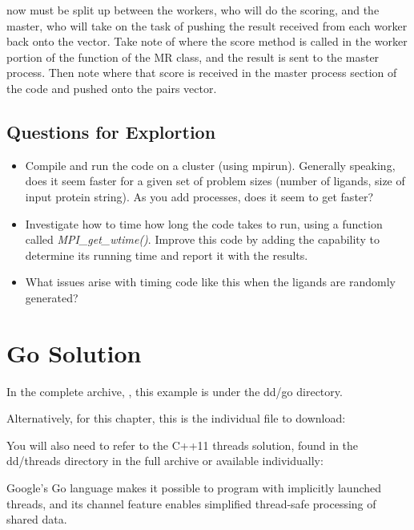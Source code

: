 \documentclass[letterpaper,10pt,openany,oneside]{sphinxmanual}
\begin{document}
now must be split up between the workers, who will do the scoring, and the master, who will take on the task of pushing the result received from each worker back onto the vector. Take note of where the score method is called in the worker portion of the  function of the MR class, and the result is sent to the master process. Then note where that score is received in the master process section of the code and pushed onto the pairs vector.


\subsection{Questions for Explortion}
\label{mpi/mpi:questions-for-explortion}\begin{itemize}
\item {} 
Compile and run the code on a cluster (using mpirun). Generally speaking, does it seem faster for a given set of problem sizes (number of ligands, size of input protein string). As you add processes, does it seem to get faster?

\item {} 
Investigate how to time how long the code takes to run, using a function called \emph{MPI\_get\_wtime()}. Improve this code by adding the capability to determine its running time and report it with the results.

\item {} 
What issues arise with timing code like this when the ligands are randomly generated?

\end{itemize}


\section{Go Solution}
\label{go/go::doc}\label{go/go:go-solution}
In the complete archive, , this example is under the dd/go directory.

Alternatively, for this chapter, this is the individual file to download:


You will also need to refer to the C++11 threads solution, found in the dd/threads directory in the full archive or available individually:


Google’s Go language makes it possible to program with implicitly launched threads, and its channel feature enables simplified thread-safe processing of shared data.
\end{document}
